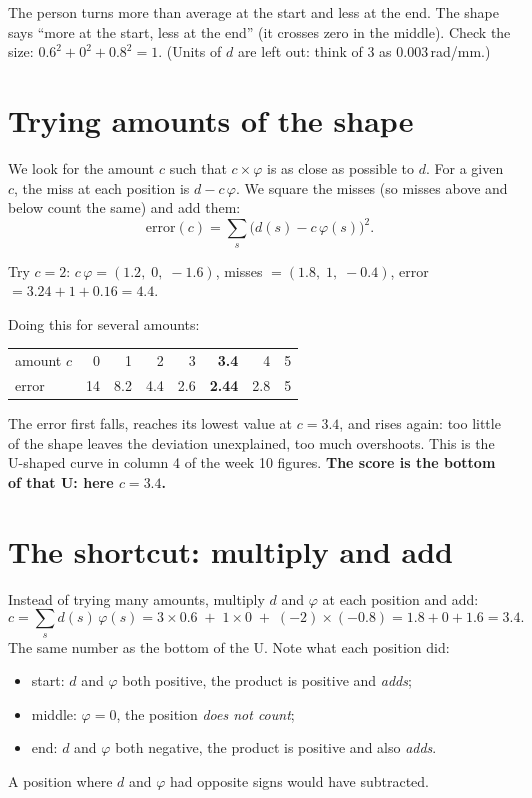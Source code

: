 \documentclass[11pt,a4paper]{article}
\begin{document}
The person turns more than average at the start and less at the end. The shape says ``more at the
start, less at the end'' (it crosses zero in the middle). Check the size: $0.6^2 + 0^2 + 0.8^2 = 1$.
(Units of $d$ are left out: think of $3$ as $0.003$\,rad/mm.)

\section{Trying amounts of the shape}
We look for the amount $c$ such that $c \times \varphi$ is as close as possible to $d$.
For a given $c$, the miss at each position is $d - c\,\varphi$. We square the misses (so misses above
and below count the same) and add them:
\[
  \text{error}(c) = \sum_s \bigl(d(s) - c\,\varphi(s)\bigr)^2 .
\]

Try $c = 2$: $c\,\varphi = (1.2,\; 0,\; -1.6)$, misses $= (1.8,\; 1,\; -0.4)$,
error $= 3.24 + 1 + 0.16 = 4.4$.

Doing this for several amounts:

\begin{center}
\begin{tabular}{lrrrrrrr}
  \toprule
  amount $c$ & 0 & 1 & 2 & 3 & \textbf{3.4} & 4 & 5 \\
  error & 14 & 8.2 & 4.4 & 2.6 & \textbf{2.44} & 2.8 & 5 \\
  \bottomrule
\end{tabular}
\end{center}

The error first falls, reaches its lowest value at $c = 3.4$, and rises again: too little of the shape
leaves the deviation unexplained, too much overshoots. This is the U-shaped curve in column 4 of the
week 10 figures. \textbf{The score is the bottom of that U: here $c = 3.4$.}

\section{The shortcut: multiply and add}
Instead of trying many amounts, multiply $d$ and $\varphi$ at each position and add:
\[
  c = \sum_s d(s)\,\varphi(s) = 3 \times 0.6 \;+\; 1 \times 0 \;+\; (-2) \times (-0.8)
    = 1.8 + 0 + 1.6 = 3.4 .
\]
The same number as the bottom of the U. Note what each position did:
\begin{itemize}
  \item start: $d$ and $\varphi$ both positive, the product is positive and \emph{adds};
  \item middle: $\varphi = 0$, the position \emph{does not count};
  \item end: $d$ and $\varphi$ both negative, the product is positive and also \emph{adds}.
\end{itemize}
A position where $d$ and $\varphi$ had opposite signs would have subtracted.
\end{document}
